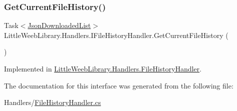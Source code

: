 \subsubsection{\texorpdfstring{Get\+Current\+File\+History()}{GetCurrentFileHistory()}}
{\footnotesize\ttfamily Task$<$\mbox{\hyperlink{class_little_weeb_library_1_1_models_1_1_json_downloaded_list}{Json\+Downloaded\+List}}$>$ Little\+Weeb\+Library.\+Handlers.\+I\+File\+History\+Handler.\+Get\+Current\+File\+History (\begin{DoxyParamCaption}{ }\end{DoxyParamCaption})}



Implemented in \mbox{\hyperlink{class_little_weeb_library_1_1_handlers_1_1_file_history_handler_a7e5a72e2cfdc3dfe97066cc7504b4445}{Little\+Weeb\+Library.\+Handlers.\+File\+History\+Handler}}.



The documentation for this interface was generated from the following file\+:\begin{DoxyCompactItemize}
\item 
Handlers/\mbox{\hyperlink{_file_history_handler_8cs}{File\+History\+Handler.\+cs}}\end{DoxyCompactItemize}
